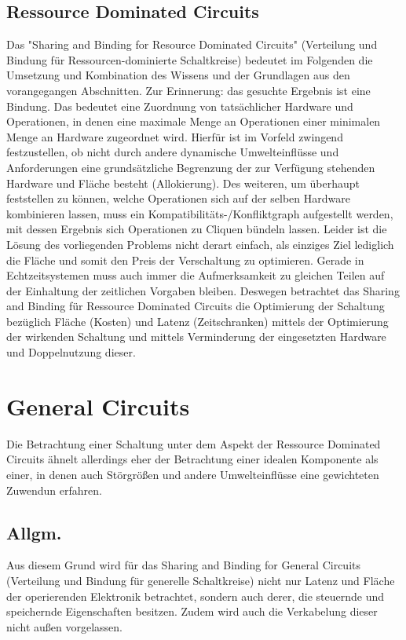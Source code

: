 \documentclass[conference]{IEEEtran}
\begin{document}
\subsection{Ressource Dominated Circuits}
Das "Sharing and Binding for Resource Dominated Circuits" (Verteilung und Bindung für Ressourcen-dominierte Schaltkreise) bedeutet im Folgenden die Umsetzung und Kombination des Wissens und der Grundlagen aus den vorangegangen Abschnitten.
Zur Erinnerung: das gesuchte Ergebnis ist eine Bindung. Das bedeutet eine Zuordnung von tatsächlicher Hardware und Operationen, in denen eine maximale Menge an Operationen einer minimalen Menge an Hardware zugeordnet wird. Hierfür ist im Vorfeld zwingend festzustellen, ob nicht durch andere dynamische Umwelteinflüsse und Anforderungen eine grundsätzliche Begrenzung der zur Verfügung stehenden Hardware und Fläche besteht (Allokierung). Des weiteren, um überhaupt feststellen zu können, welche Operationen sich auf der selben Hardware kombinieren lassen, muss ein Kompatibilitäts-/Konfliktgraph aufgestellt werden, mit dessen Ergebnis sich Operationen zu Cliquen bündeln lassen.
Leider ist die Lösung des vorliegenden Problems nicht derart einfach, als einziges Ziel lediglich die Fläche und somit den Preis der Verschaltung zu optimieren. Gerade in Echtzeitsystemen muss auch immer die Aufmerksamkeit zu gleichen Teilen auf der Einhaltung der zeitlichen Vorgaben bleiben.
Deswegen betrachtet das Sharing and Binding für Ressource Dominated Circuits die Optimierung der Schaltung bezüglich Fläche (Kosten) und  Latenz (Zeitschranken) mittels der Optimierung der wirkenden Schaltung und mittels Verminderung der eingesetzten Hardware und Doppelnutzung dieser.\cite[S. 156]{3} 









\section{General Circuits}
Die Betrachtung einer Schaltung unter dem Aspekt der Ressource Dominated Circuits ähnelt allerdings eher der Betrachtung einer idealen Komponente als einer, in denen auch Störgrößen und andere Umwelteinflüsse eine gewichteten Zuwendun erfahren.
\subsection{Allgm.}
Aus diesem Grund wird für das Sharing and Binding for General Circuits (Verteilung und Bindung für generelle Schaltkreise) nicht nur Latenz und Fläche der operierenden Elektronik betrachtet, sondern auch derer, die steuernde und speichernde Eigenschaften besitzen. Zudem wird auch die Verkabelung dieser nicht außen vorgelassen.\cite[S. 156]{3}
\end{document}
